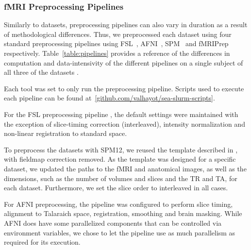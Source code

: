     
    
    \subsubsection{fMRI Preprocessing Pipelines}
    
    Similarly to datasets, preprocessing pipelines can also vary in duration as a result of methodological differences.
    Thus, we preprocessed each dataset using four  standard preprocessing pipelines using FSL~\cite{fsl}, AFNI~\cite{AFNI},
    SPM~\cite{spm} and fMRIPrep~\cite{fmriprep} respectively. Table~\ref{table:pipelines} provides a reference of the differences in computation and data-intensivity
    of the different pipelines on a single subject of all three of the datasets .
    
    Each tool was set to only run the preprocessing pipeline. Scripts used to execute each pipeline can be found at~\ref{github.com/valhayot/sea-slurm-scripts}.
    
    For the FSL preprocessing pipeline , the default settings were maintained with the exception of slice-timing correction (interleaved),
    intensity normalization and non-linear registration to standard space.
    

    To preprocess the datasets with SPM12, we reused the template described in \cite{haitas2021}, with fieldmap correction removed.
    As the template was designed for a specific dataset, we updated the paths to the fMRI and anatomical images,
    as well as the dimensions, such as the number of volumes and slices and the TR and TA, for each dataset. Furthermore,
    we set the slice order to interleaved in all cases. 
    
    For AFNI preprocessing, the pipeline was configured to perform slice timing, alignment to Talaraich space, registration, smoothing
    and brain masking. While AFNI does have some parallelized components that can be controlled via environment variables, we chose to let 
    the pipeline use as much parallelism as required for its execution.
    
